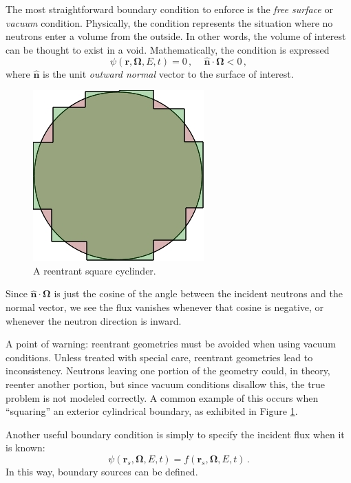The most straightforward boundary condition to enforce is the \textit{free surface} or \textit{vacuum} condition.  Physically, the condition represents the situation where no neutrons enter a volume from the outside.  In other words, the volume of interest can be thought to exist in a void.  Mathematically, the condition is expressed
\begin{equation}
 \psi(\mathbf{r},\mathbf{\Omega},E,t) = 0 \, , \, \, \, \,  \, \, \, \mathbf{\hat{n}} \cdot \mathbf{\Omega} < 0 \, ,
\end{equation}
where $\mathbf{\hat{n}}$ is the unit \textit{outward normal} vector to the surface of interest.  
\begin{figure}
    \begin{center}
    \includegraphics[keepaspectratio, width = 1.25 in]{images/squarecylinder}
    \end{center}
    \caption{A reentrant square cyclinder.}
    \label{fig:squarecylinder}
\end{figure}
Since $\mathbf{\hat{n}} \cdot \mathbf{\Omega}$ is just the cosine of the angle between the incident neutrons and the normal vector, we see the flux vanishes whenever that cosine is negative, or whenever the neutron direction is inward.

A point of warning: reentrant geometries must be avoided when using vacuum conditions.  Unless treated with special care, reentrant geometries lead to inconsistency.  Neutrons leaving one portion of the geometry could, in theory, reenter another portion, but since vacuum conditions disallow this, the true problem is not modeled correctly.  A common example of this occurs when ``squaring'' an exterior cylindrical boundary, as exhibited in Figure \ref{fig:squarecylinder}.

Another useful boundary condition is simply to specify the incident flux when it is known:
\begin{equation}
 \psi(\mathbf{r}_s,\mathbf{\Omega},E,t) = f(\mathbf{r}_s,\mathbf{\Omega},E,t) \, .
\end{equation}
In this way, boundary sources can be defined.

